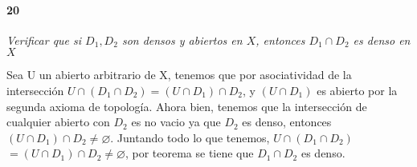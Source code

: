 \documentclass[12pt]{article}
\begin{document}
\paragraph{20}
\textit{Verificar que si $D_{1}, D_{2}$ son densos y abiertos en $X$, entonces $D_{1} \cap D_{2}$ es denso en $X$}

Sea U un abierto arbitrario de X, tenemos que por
asociatividad de la intersecci\'on
$U \cap (D_{1} \cap D_{2}) = (U \cap D_{1}) \cap D_{2}$,
y $(U \cap D_{1})$ es abierto por la segunda axioma de
topolog\'ia. Ahora bien, tenemos que la intersecci\'on de
cualquier abierto con $D_{2}$ es no vacio ya que $D_{2}$ es
denso, entonces $(U \cap D_{1}) \cap D_{2} \neq \varnothing$.
Juntando todo lo que tenemos, $U \cap (D_{1} \cap D_{2})$
$= (U \cap D_{1}) \cap D_{2} \neq \varnothing$, por teorema
se tiene que $D_{1} \cap D_{2}$ es denso.
\end{document}
